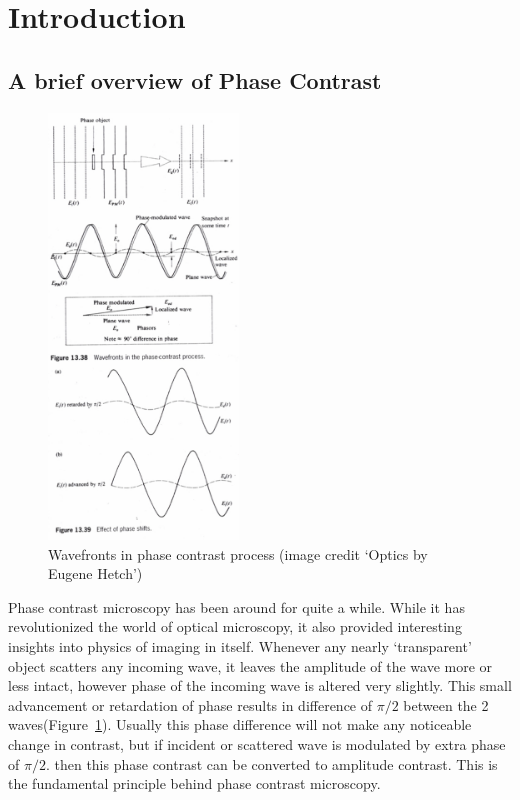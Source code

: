 \section{Introduction}

\subsection{A brief overview of Phase Contrast}
\begin{figure}
        \centering
            \includegraphics[width=0.45\textwidth]{figures/phasediff.pdf}
            \caption{Wavefronts in phase contrast process (image credit `Optics by Eugene Hetch')}
            \label{fig:hetchphase}
\end{figure}


Phase contrast microscopy has been around for quite a while.
While it has revolutionized the world of optical microscopy, it also provided interesting insights into physics of imaging in itself.
Whenever any nearly `transparent' object scatters any incoming wave, it leaves the amplitude of the wave more or less intact, however phase of the incoming wave is altered very slightly.
This small advancement or retardation of phase results in difference of $\pi/2$ between the 2 waves(Figure~\ref{fig:hetchphase}).
Usually this phase difference will not make any noticeable change in contrast, but if incident or scattered wave is modulated by extra phase of $\pi/2$. then this phase contrast can be converted to amplitude contrast.
This is the fundamental principle behind phase contrast microscopy.

